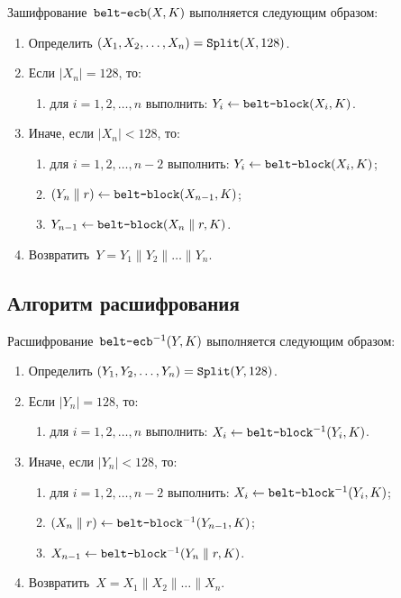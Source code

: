 Зашифрование~$\texttt{belt-ecb}(X,K)$ выполняется следующим образом: 
\begin{enumerate}
\item
Определить $(X_1,X_2,\ldots,X_n)=\mathop{\texttt{Split}}\nolimits(X,128)$.
\item
Если $|X_n|=128$, то:
\begin{enumerate}
\item
для $i=1,2,\ldots,n$ выполнить: $Y_i\leftarrow \texttt{belt-block}(X_i,K)$.
\end{enumerate}

\item
Иначе, если $|X_n|<128$, то:
\begin{enumerate}
\item
для $i=1,2,\ldots,n-2$ выполнить: $Y_i\leftarrow \texttt{belt-block}(X_i,K)$;

\item
$(Y_n\parallel r)\leftarrow \texttt{belt-block}(X_{n-1},K)$;

\item
$Y_{n-1}\leftarrow \texttt{belt-block}(X_n\parallel r,K)$.
\end{enumerate}

\item
Возвратить~$Y=Y_1\parallel Y_2\parallel\ldots\parallel Y_n$.
\end{enumerate}

\subsection{Алгоритм расшифрования}\label{ECB.Decr}

Расшифрование~$\texttt{belt-ecb}^{-1}(Y,K)$ выполняется следующим образом: 
\begin{enumerate}
\item
Определить $(Y_1,Y_2,\ldots,Y_n)=\mathop{\texttt{Split}}\nolimits(Y,128)$.
\item
Если $|Y_n|=128$, то:
\begin{enumerate}
\item
для $i=1,2,\ldots,n$ выполнить: $X_i\leftarrow \texttt{belt-block}^{-1}(Y_i,K)$.
\end{enumerate}
\item
Иначе, если $|Y_n|<128$, то:
\begin{enumerate}
\item
для $i=1,2,\ldots,n-2$ 
выполнить: $X_i\leftarrow \texttt{belt-block}^{-1}(Y_i,K)$;
\item
$(X_n\parallel r)\leftarrow \texttt{belt-block}^{-1}(Y_{n-1},K)$;
\item
$X_{n-1}\leftarrow \texttt{belt-block}^{-1}(Y_n\parallel r,K)$.
\end{enumerate}
\item
Возвратить~$X=X_1\parallel X_2\parallel\ldots\parallel X_n$.
\end{enumerate}
